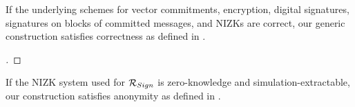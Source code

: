 \begin{theorem}
  \label{thm:correctness-uas}
  If the underlying schemes for vector commitments, encryption, digital
  signatures, signatures on blocks of committed messages, and NIZKs are
  correct, our generic construction \CUASGen satisfies correctness as
  defined in .
\end{theorem}

\begin{proof}[]
\end{proof}

\begin{theorem}
  \label{thm:anonymity-uas}
  If the NIZK system used for $\mathcal{R}_{Sign}$ is zero-knowledge and
  simulation-extractable, our \CUASGen construction satisfies anonymity as
  defined in .
\end{theorem}

